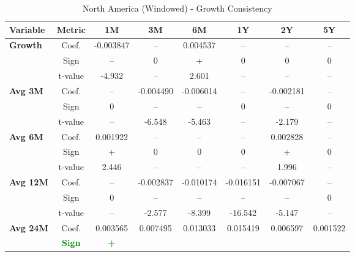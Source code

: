 \documentclass[11pt,english,a4paper,hidelinks]{book}
\begin{document}
\begin{table}[H]
    \centering
    \caption{North America (Windowed) - Growth Consistency}
    \begin{tabular}{lccccccc}
        \toprule
        \textbf{Variable} & \textbf{Metric} & \textbf{1M} & \textbf{3M} & \textbf{6M} & \textbf{1Y} & \textbf{2Y} & \textbf{5Y} \\
        \midrule
        \multirow{3}{*}{\textbf{Growth}}
            & Coef.   & -0.003847 & --        & 0.004537  & --        & --        & --        \\
            & Sign    & –         & 0         & +         & 0         & 0         & 0         \\
            & t-value & -4.932    & --        & 2.601     & --        & --        & --        \\
        \cmidrule{1-8}
        \multirow{3}{*}{\textbf{Avg 3M}}
        & Coef.   & --        & -0.004490 & -0.006014 & --        & -0.002181 & --        \\
        & Sign    & 0         & –         & –         & 0         & –         & 0         \\
        & t-value & --        & -6.548    & -5.463    & --        & -2.179    & --        \\
    \cmidrule{1-8}
        \multirow{3}{*}{\textbf{Avg 6M}}
            & Coef.   & 0.001922  & --        & --        & --        & 0.002828  & --        \\
            & Sign    & +         & 0         & 0         & 0         & +         & 0         \\
            & t-value & 2.446     & --        & --        & --        & 1.996     & --        \\
        \cmidrule{1-8}
        \multirow{3}{*}{\textbf{Avg 12M}}
            & Coef.   & --        & -0.002837 & -0.010174 & -0.016151 & -0.007067 & --        \\
            & Sign    & 0         & –         & –         & –         & –         & 0         \\
            & t-value & --        & -2.577    & -8.399    & -16.542   & -5.147    & --        \\
        \cmidrule{1-8}
        \multirow{3}{*}{\textbf{Avg 24M}}
            & Coef.   & 0.003565  & 0.007495  & 0.013033  & 0.015419  & 0.006597  & 0.001522  \\
            & \textbf{\textcolor{green}{Sign}}
                     & \textbf{\textcolor{green}{+}}

\end{tabular}
\end{table}
\end{document}
